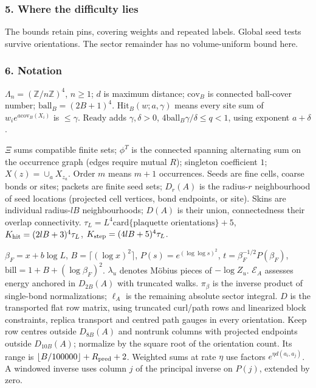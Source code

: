 \documentclass[
  letterpaper,
  11pt]{article}
\begin{document}
\subsubsection{5. Where the difficulty
lies}\label{where-the-difficulty-lies-7}

The bounds retain pins, covering weights and repeated labels. Global
seed tests survive orientations. The sector remainder has no
volume-uniform bound here.

\subsubsection{6. Notation}\label{notation-7}

\(\Lambda_n=(\mathbb Z/n\mathbb Z)^4\), \(n\ge1\); \(d\) is maximum
distance; \(\mathrm{cov}_B\) is connected ball-cover number;
\(\mathrm{ball}_B=(2B+1)^4\). \(\mathrm{Hit}_B(w;a,\gamma)\) means every
site sum of \(w_ie^{a\mathrm{cov}_B(X_i)}\) is \(\le\gamma\).
\(\mathrm{Ready}\) adds \(\gamma,\delta>0\),
\(4\mathrm{ball}_B\gamma/\delta\le q<1\), using exponent \(a+\delta\).

\(\Xi\) sums compatible finite sets; \(\phi^T\) is the connected
spanning alternating sum on the occurrence graph (edges require mutual
\(R\)); singleton coefficient \(1\); \(X(z)=\cup_aX_{z_a}\). Order \(m\)
means \(m+1\) occurrences. Seeds are fine cells, coarse bonds or sites;
packets are finite seed sets; \(D_r(A)\) is the radius-\(r\)
neighbourhood of seed locations (projected cell vertices, bond
endpoints, or site). Skins are individual radius-\(lB\) neighbourhoods;
\(D(A)\) is their union, connectedness their overlap connectivity.
\(\tau_L=L^4\mathrm{card}\{\text{plaquette orientations}\}+5\),
\(K_{\rm hit}=(2lB+3)^4\tau_L\), \(K_{\rm step}=(4lB+5)^4\tau_L\).

\(\beta_F=x+b\log L\), \(B=\lceil(\log x)^2\rceil\),
\(P(s)=e^{(\log\log s)^2}\), \(t=\beta_F^{-1/2}P(\beta_F)\),
\(\mathrm{bill}=1+B+(\log\beta_F)^2\). \(\lambda_u\) denotes Möbius
pieces of \(-\log Z_u\). \(\mathcal E_A\) assesses energy anchored in
\(D_{2B}(A)\) with truncated walks. \(\pi_\beta\) is the inverse product
of single-bond normalizations; \(\ell_A\) is the remaining absolute
sector integral. \(D\) is the transported flat row matrix, using
truncated curl/path rows and linearized block constraints, replica
transport and centred path gauges in every orientation. Keep row centres
outside \(D_{8B}(A)\) and nontrunk columns with projected endpoints
outside \(D_{10B}(A)\); normalize by the square root of the orientation
count. Its range is \(\lfloor B/100000\rfloor+R_{\rm pred}+2\). Weighted
sums at rate \(\eta\) use factors \(e^{\eta d(a_i,a_j)}\). A windowed
inverse uses column \(j\) of the principal inverse on \(P(j)\), extended
by zero.
\end{document}
